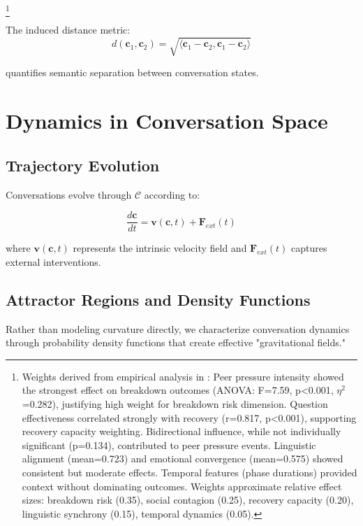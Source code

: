 \documentclass[11pt,letterpaper]{article}
\begin{document}
\footnote{Weights derived from empirical analysis in \citep{garcia2025peer}: Peer pressure intensity showed the strongest effect on breakdown outcomes (ANOVA: F=7.59, p<0.001, $\eta^2$=0.282), justifying high weight for breakdown risk dimension. Question effectiveness correlated strongly with recovery (r=0.817, p<0.001), supporting recovery capacity weighting. Bidirectional influence, while not individually significant (p=0.134), contributed to peer pressure events. Linguistic alignment (mean=0.723) and emotional convergence (mean=0.575) showed consistent but moderate effects. Temporal features (phase durations) provided context without dominating outcomes. Weights approximate relative effect sizes: breakdown risk (0.35), social contagion (0.25), recovery capacity (0.20), linguistic synchrony (0.15), temporal dynamics (0.05).}

The induced distance metric:
\begin{equation}
d(\mathbf{c}_1, \mathbf{c}_2) = \sqrt{\langle \mathbf{c}_1 - \mathbf{c}_2, \mathbf{c}_1 - \mathbf{c}_2 \rangle}
\end{equation}

quantifies semantic separation between conversation states.

\section{Dynamics in Conversation Space}

\subsection{Trajectory Evolution}

Conversations evolve through $\mathcal{C}$ according to:

\begin{equation}
\frac{d\mathbf{c}}{dt} = \mathbf{v}(\mathbf{c}, t) + \mathbf{F}_{ext}(t)
\end{equation}

where $\mathbf{v}(\mathbf{c}, t)$ represents the intrinsic velocity field and $\mathbf{F}_{ext}(t)$ captures external interventions.

\subsection{Attractor Regions and Density Functions}

Rather than modeling curvature directly, we characterize conversation dynamics through probability density functions that create effective "gravitational fields."
\end{document}
